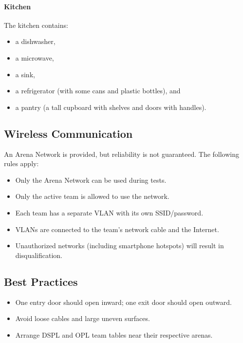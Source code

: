 \paragraph{Kitchen} The kitchen contains:
\begin{itemize}
    \item a dishwasher,
    \item a microwave,
    \item a sink,
    \item a refrigerator (with some cans and plastic bottles), and
    \item a pantry (a tall cupboard with shelves and doors with handles).
\end{itemize}

\subsection{Wireless Communication}
An Arena Network is provided, but reliability is not guaranteed. The following rules apply:
\begin{itemize}
    \item Only the Arena Network can be used during tests.
    \item Only the active team is allowed to use the network.
    \item Each team has a separate VLAN with its own SSID/password.
    \item VLANs are connected to the team’s network cable and the Internet.
    \item Unauthorized networks (including smartphone hotspots) will result in disqualification.
\end{itemize}

\subsection{Best Practices}
\begin{itemize}
    \item One entry door should open inward; one exit door should open outward.
    \item Avoid loose cables and large uneven surfaces.
    \item Arrange DSPL and OPL team tables near their respective arenas.
\end{itemize}

